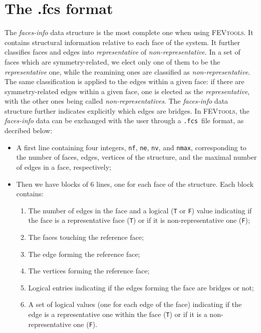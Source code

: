 \documentclass{scrreprt}
\newcommand{\fcs}{\texttt{.fcs}}
\begin{document}
\section{The .fcs format}
The \emph{faces-info} data structure is the most complete one when using \textsc{FEVtools}. It contains structural information relative to each face of the system. It further classifies faces and edges into \emph{representative} of \emph{non-representative}. In a set of faces which are symmetry-related, we elect only one of them to be the \emph{representative} one, while the reamining ones are classified as \emph{non-representative}. The same classification is applied to the edges within a given face: if there are symmetry-related edges within a given face, one is elected as the \emph{representative}, with the other ones being called \emph{non-representatives}. The \emph{faces-info} data structure further indicates explicitly which edges are bridges. In \textsc{FEVtools}, the \emph{faces-info} data can be exchanged with the user through a \fcs~file format, as decribed below:
\begin{itemize}
 \item A first line containing four integers, \verb-nf-, \verb-ne-, \verb-nv-, and \verb-nmax-, corresponding to the number of faces, edges, vertices of the structure, and the maximal number of edges in a face, respectively;
 \item Then we have blocks of 6 lines, one for each face of the structure. Each block contains:
 \begin{enumerate}
  \item The number of edges in the face and a logical (\verb-T- or \verb-F-) value indicating if the face is a representative face (\verb-T-) or if it is non-representative one (\verb-F-);
  \item The faces touching the reference face;
  \item The edge forming the reference face;
  \item The vertices forming the reference face;
  \item Logical entries indicating if the edges forming the face are bridges or not;
  \item A set of logical values (one for each edge of the face) indicating if the edge is a representative one within the face (\verb-T-) or if it is a non-representative one (\verb-F-).
 \end{enumerate}
\end{itemize}
\end{document}
